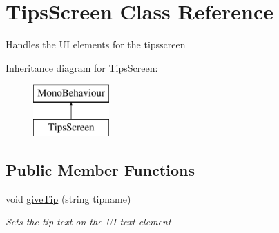 \hypertarget{class_tips_screen}{}\section{Tips\+Screen Class Reference}
\label{class_tips_screen}


Handles the UI elements for the tipsscreen  


Inheritance diagram for Tips\+Screen\+:\begin{figure}[H]
\begin{center}
\leavevmode
\includegraphics[height=2.000000cm]{class_tips_screen}
\end{center}
\end{figure}
\subsection*{Public Member Functions}
\begin{DoxyCompactItemize}
\item 
void \hyperlink{class_tips_screen_aca641b0e1e57e634af34f0c430b193fb}{give\+Tip} (string tipname)
\begin{DoxyCompactList}\small\item\em Sets the tip text on the UI text element \end{DoxyCompactList}\end{DoxyCompactItemize}
